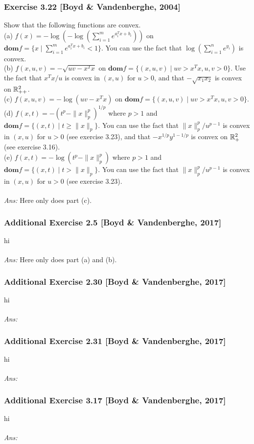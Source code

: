 \documentclass[12pt,a4paper]{article}
\newcommand\dom{\mathbf{dom}}
\def\R{\ifmmode\mathbb R\fi}
\begin{document}
\newpage\subsubsection*{Exercise 3.22 [Boyd \& Vandenberghe, 2004]}
 Show that the following functions are convex. \\
(a) $f(x) = -\log(-\log(\sum^m_{i=1} e^{a_i^T x + b_i}))$ on $\dom f = \{x \mid \sum^m_{i=1} e^{a_i^T x + b_i} < 1\}$. You can use the fact that $\log(\sum^n_{i=1} e^{y_i})$ is convex.\\
(b) $f(x, u, v) = -\sqrt{uv-x^Tx}$ on $\dom f = \{(x,u,v) \mid uv>x^T x, u, v>0\}$. Use the fact that $x^T x/u$ is convex in $(x, u)$ for $u>0$, and that $-\sqrt{x_1x_2}$ is convex on $\R^2_{++}$. \\
(c) $f(x,u,v) = -\log(uv-x^Tx)$ on $\dom f = \{(x,u,v) \mid uv>x^Tx, u,v>0\}$.\\
(d) $f(x,t) = -(t^p - \|x\|_p^p)^{1/p}$ where $p>1$ and $\dom f = \{(x, t) \mid t\geq \|x\|_p\}$. You can use the fact that $\|x\|^p_p/u^{p-1}$ is convex in $(x,u)$ for $u>0$ (see exercise 3.23), and that $-x^{1/p}y^{1-1/p}$ is convex on $\R^2_+$ (see exercise 3.16). \\
(e) $f(x,t) = -\log(t^p - \|x\|_p^p)$ where $p>1$ and $\dom f = \{(x,t) \mid t>\|x\|_p\}$. You can use the fact that $\|x\|^p_p/u^{p-1}$ is convex in $(x,u)$ for $u>0$ (see exercise 3.23).\\
\\
{\it Ans:} Here only does part (c). 


\newpage\subsubsection*{Additional Exercise 2.5 [Boyd \& Vandenberghe, 2017]}
\noindent hi\\
\\
{\it Ans:} Here only does part (a) and (b). 



\newpage\subsubsection*{Additional Exercise 2.30 [Boyd \& Vandenberghe, 2017]}
\noindent hi\\
\\
{\it Ans:} 


\newpage\subsubsection*{Additional Exercise 2.31 [Boyd \& Vandenberghe, 2017]}
\noindent hi\\
\\
{\it Ans:} 


\newpage\subsubsection*{Additional Exercise 3.17 [Boyd \& Vandenberghe, 2017]}
\noindent hi\\
\\
{\it Ans:} 
\end{document}
